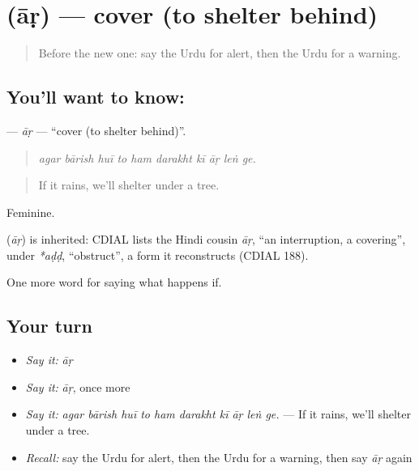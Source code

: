 \section[\texorpdfstring{\ur{آڑ} (āṛ)}{آڑ (āṛ)}]{ (āṛ) — cover (to shelter behind)}

\label{lesson:UR-C536-ar}



\begin{quote}
Before the new one: say the Urdu for alert, then the Urdu for a warning.
\end{quote}

\subsection*{You'll want to know: }
\textbf{} — \emph{āṛ} — \textquotedblleft{}cover (to shelter behind)\textquotedblright{}.

\begin{quote}
         
\end{quote}

\begin{quote}
\emph{agar bārish huī to ham darakht kī āṛ leṅ ge.}
\end{quote}

\begin{quote}
If it rains, we'll shelter under a tree.
\end{quote}

Feminine.

\begin{cousinweb}
\textbf{} (\emph{āṛ}) is inherited: CDIAL lists the Hindi cousin \emph{āṛ}, \textquotedblleft{}an interruption, a covering\textquotedblright{}, under \emph{*aḍḍ}, \textquotedblleft{}obstruct\textquotedblright{}, a form it reconstructs (CDIAL 188).
\end{cousinweb}

\begin{grammarlens}[title={What you've built}]
One more word for saying what happens if.
\end{grammarlens}

\subsection*{Your turn}
\begin{itemize}
\raggedright
  \item \emph{Say it:} \emph{āṛ}
  \item \emph{Say it:} \emph{āṛ}, once more
  \item \emph{Say it:} \emph{agar bārish huī to ham darakht kī āṛ leṅ ge.} — If it rains, we'll shelter under a tree.
  \item \emph{Recall:} say the Urdu for alert, then the Urdu for a warning, then say \emph{āṛ} again
\end{itemize}

